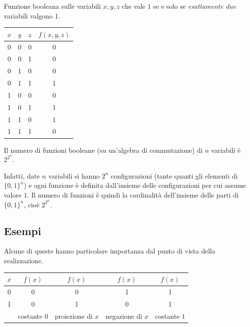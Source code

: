 \documentclass[11pt,a4paper]{article}
\begin{document}
\begin{esempio}
Funzione booleana sulle variabili $x, y, z$ che vale $1$ se e solo se
\emph{esattamente due} variabili valgono $1$.
\begin{center}
\begin{tabular}{ccc|c}
$x$ & $y$ & $z$ & $f(x,y,z)$ \\ \midrule
0 & 0 & 0 & 0 \\
0 & 0 & 1 & 0 \\
0 & 1 & 0 & 0 \\
0 & 1 & 1 & 1 \\
1 & 0 & 0 & 0 \\
1 & 0 & 1 & 1 \\
1 & 1 & 0 & 1 \\
1 & 1 & 1 & 0
\end{tabular}
\end{center}
\end{esempio}

\begin{proposizione}
Il numero di funzioni booleane (su un'algebra di commutazione) di $n$ variabili
è $2^{2^n}$.
\end{proposizione}

Infatti, date $n$ variabili si hanno $2^n$ configurazioni (tante quanti gli
elementi di $\{0,1\}^n$) e ogni funzione è definita dall'insieme delle
configurazioni per cui assume valore $1$. Il numero di funzioni è quindi la
cardinalità dell'insieme delle parti di $\{0,1\}^n$, cioè $2^{2^n}$.

\subsection{Esempi}

\begin{esempio}
Alcune di queste hanno particolare importanza dal punto di vista della
realizzazione.
\begin{center}
\begin{tabular}{c|cccc}
$x$ & $f(x)$ & $f(x)$ & $f(x)$ & $f(x)$ \\ \midrule
0 & 0 & 0 & 1 & 1 \\
1 & 0 & 1 & 0 & 1 \\ \midrule
  & \footnotesize costante $0$ & \footnotesize proiezione di $x$
  & \footnotesize negazione di $x$ & \footnotesize costante $1$
\end{tabular}
\end{center}
\end{esempio}
\end{document}
